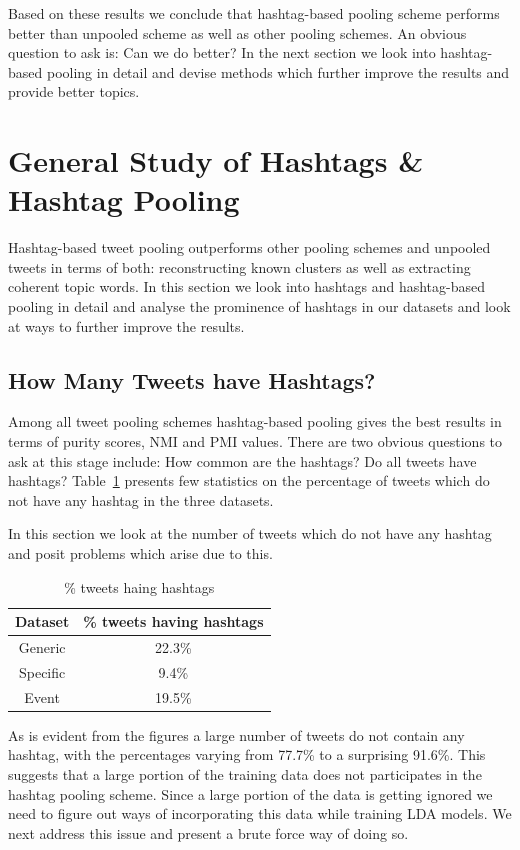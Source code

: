 \documentclass[10pt,a5paper,twoside]{article}
\begin{document}
Based on these results we conclude that hashtag-based pooling scheme
performs better than unpooled scheme as well as other pooling
schemes. An obvious question to ask is: Can we do better? In the next
section we look into hashtag-based pooling in detail and devise methods
which further improve the results and provide better topics.

\section{General Study of Hashtags \& Hashtag Pooling}

\label{sec:hashtag_pooling}

Hashtag-based tweet pooling outperforms other pooling schemes and
unpooled tweets in terms of both: reconstructing known clusters as
well as extracting coherent topic words. In this section we look into
hashtags and hashtag-based pooling in detail and analyse the
prominence of hashtags in our datasets and look at ways to further
improve the results.

\subsection{How Many Tweets have Hashtags?}

Among all tweet pooling schemes hashtag-based pooling gives the best
results in terms of purity scores, NMI and PMI values. There are two
obvious questions to ask at this stage include: How common are the
hashtags? Do all tweets have hashtags? Table~\ref{tbl-7} presents few
statistics on the percentage of tweets which do not have any hashtag
in the three datasets.

In this section we look at the number of tweets which do not have any
hashtag and posit problems which arise due to this.

\begin{table}[!h]
\centering
	\begin{tabular}{|c|c|}
	\hline
	Dataset & \% tweets having hashtags\\
	\hline
	Generic & 22.3\%\\
	\hline
	Specific & 9.4\% \\
	\hline
	Event & 19.5\% \\
	\hline
	\end{tabular}
\caption{\% tweets haing hashtags}\label{tbl-7}
\end{table}

As is evident from the figures a large number of tweets do not contain
any hashtag, with the percentages varying from 77.7\% to a surprising
91.6\%. This suggests that a large portion of the training data does
not participates in the hashtag pooling scheme. Since a large portion
of the data is getting ignored we need to figure out ways of
incorporating this data while training LDA models. We next address
this issue and present a brute force way of doing so.
\end{document}
